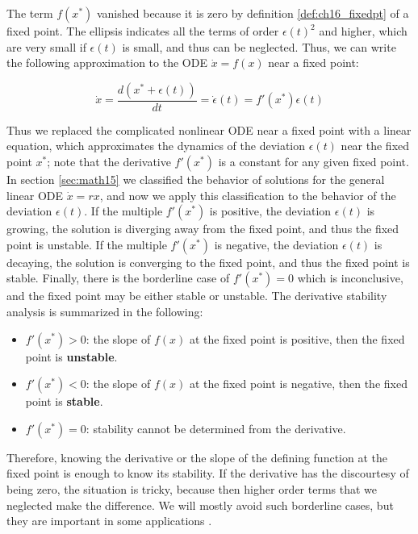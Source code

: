 \documentclass[
  letterpaper,
  DIV=11,
  numbers=noendperiod]{scrreprt}
\providecommand{\tightlist}{%
  \setlength{\itemsep}{0pt}\setlength{\parskip}{0pt}}\usepackage{longtable,booktabs,array}
\begin{document}
The term \(f(x^*)\) vanished because it is zero by definition
\ref{def:ch16_fixedpt} of a fixed point. The ellipsis indicates all the
terms of order \(\epsilon(t)^2\) and higher, which are very small if
\(\epsilon(t)\) is small, and thus can be neglected. Thus, we can write
the following approximation to the ODE \(\dot x = f(x)\) near a fixed
point:

\[ \dot x =  \frac{d(x^* + \epsilon(t))}{dt} = \dot \epsilon(t) =  f'(x^*) \epsilon(t)\]

Thus we replaced the complicated nonlinear ODE near a fixed point with a
linear equation, which approximates the dynamics of the deviation
\(\epsilon(t)\) near the fixed point \(x^*\); note that the derivative
\(f'(x^*)\) is a constant for any given fixed point. In section
\ref{sec:math15} we classified the behavior of solutions for the general
linear ODE \(\dot x = rx\), and now we apply this classification to the
behavior of the deviation \(\epsilon(t)\). If the multiple \(f'(x^*)\)
is positive, the deviation \(\epsilon(t)\) is growing, the solution is
diverging away from the fixed point, and thus the fixed point is
unstable. If the multiple \(f'(x^*)\) is negative, the deviation
\(\epsilon(t)\) is decaying, the solution is converging to the fixed
point, and thus the fixed point is stable. Finally, there is the
borderline case of \(f'(x^*) = 0\) which is inconclusive, and the fixed
point may be either stable or unstable. The
 derivative stability
analysis is summarized in the following:

\begin{itemize}
\tightlist
\item
  \(f'(x^*) > 0\): the slope of \(f(x)\) at the fixed point is positive,
  then the fixed point is \textbf{unstable}.
\item
  \(f'(x^*) < 0\): the slope of \(f(x)\) at the fixed point is negative,
  then the fixed point is \textbf{stable}.
\item
  \(f'(x^*) = 0\): stability cannot be determined from the derivative.
\end{itemize}

Therefore, knowing the derivative or the slope of the defining function
at the fixed point is enough to know its stability. If the derivative
has the discourtesy of being zero, the situation is tricky, because then
higher order terms that we neglected make the difference. We will mostly
avoid such borderline cases, but they are important in some applications
\cite{strogatz_nonlinear_2001}.
\end{document}
